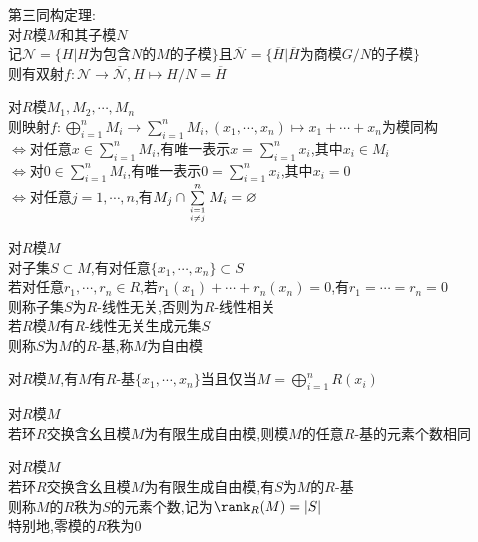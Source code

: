 \begin{dingli}
第三同构定理:\\
对$R$模$M$和其子模$N$\\
记$\mathscr{N}=\{H|H\text{为包含}N\text{的}M\text{的子模}\}$且$\overline{\mathscr{N}}=\{\overline{H}|\overline{H}\text{为商模}G/N\text{的子模}\}$\\
则有双射$f:\mathscr{N}\to \overline{\mathscr{N}},H\mapsto H/N=\overline{H}$
\end{dingli}

\begin{dingli}
对$R$模$M_1,M_2,\cdots,M_n$\\
则映射$f:\bigoplus\limits_{i=1}^{n}M_i\to \sum\limits_{i=1}^{n}M_i,(x_1,\cdots,x_n)\mapsto x_1+\cdots+x_n$为模同构\\
$\Leftrightarrow$对任意$x\in \sum\limits_{i=1}^{n}M_i$,有唯一表示$x=\sum\limits_{i=1}^{n}x_i$,其中$x_i\in M_i$\\
$\Leftrightarrow$对$0\in \sum\limits_{i=1}^{n}M_i$,有唯一表示$0=\sum\limits_{i=1}^{n}x_i$,其中$x_i=0$\\
$\Leftrightarrow$对任意$j=1,\cdots,n$,有$M_j\cap\sum\limits_{i=1\atop i\neq j}^{n}M_i=\varnothing$
\end{dingli}

\begin{dingyi}
对$R$模$M$\\
对子集$S\subset M$,有对任意$\{x_1,\cdots,x_n\}\subset S$\\
若对任意$r_1,\cdots,r_n\in R$,若$r_1(x_1)+\cdots+r_n(x_n)=0$,有$r_1=\cdots=r_n=0$\\
则称子集$S$为$R$-线性无关,否则为$R$-线性相关\\
若$R$模$M$有$R$-线性无关生成元集$S$\\
则称$S$为$M$的$R$-基,称$M$为自由模
\end{dingyi}

\begin{tuilun}
对$R$模$M$,有$M$有$R$-基$\{x_1,\cdots,x_n\}$当且仅当$M=\bigoplus\limits_{i=1}^{n}R(x_i)$
\end{tuilun}

\begin{dingli}
对$R$模$M$\\
若环$R$交换含幺且模$M$为有限生成自由模,则模$M$的任意$R$-基的元素个数相同
\end{dingli}

\begin{dingyi}
对$R$模$M$\\
若环$R$交换含幺且模$M$为有限生成自由模,有$S$为$M$的$R$-基\\
则称$M$的$R$秩为$S$的元素个数,记为$\rank_{R}(M)=|S|$\\
特别地,零模的$R$秩为$0$
\end{dingyi}

